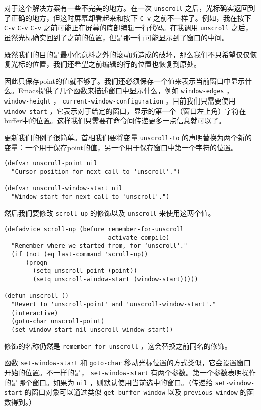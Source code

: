 对于这个解决方案有一些不完美的地方。在一次 \texttt{unscroll} 之后，光标确实返回到了正确的地方，但这时屏幕却看起来和按下 \verb|C-v| 之前不一样了。例如，我在按下 \verb|C-v| \verb|C-v| \verb|C-v| 之前可能正在屏幕的底部编辑一行代码。在我调用 \texttt{unscroll} 之后，虽然光标确实回到了之前的位置，但是那一行可能显示到了窗口的中间。

既然我们的目的是最小化意料之外的滚动所造成的破坏，那么我们不只希望仅仅恢复光标的位置，我们还希望之前编辑的行的位置也恢复到原处。

因此只保存point的值就不够了。我们还必须保存一个值来表示当前窗口中显示什么。Emacs提供了几个函数来描述窗口中显示什么，例如 \texttt{window-edges} ， \texttt{window-height} ， \texttt{current-window-configuration} 。目前我们只需要使用 \texttt{window-start} ，它表示对于给定的窗口，显示的第一个（窗口左上角）字符在buffer中的位置。这样我们只需要在命令间传递更多一点信息就可以了。

更新我们的例子很简单。首相我们要将变量 \texttt{unscroll-to} 的声明替换为两个新的变量：一个用于保存point的值，另一个用于保存窗口中第一个字符的位置。

\begin{verbatim}
(defvar unscroll-point nil
  "Cursor position for next call to 'unscroll'.")
  
(defvar unscroll-window-start nil
  "Window start for next call to 'unscroll'.")
\end{verbatim}

然后我们要修改 \texttt{scroll-up} 的修饰以及 \texttt{unscroll} 来使用这两个值。

\begin{verbatim}
(defadvice scroll-up (before remember-for-unscroll
                             activate compile)
  "Remember where we started from, for ‘unscroll'."
  (if (not (eq last-command 'scroll-up))
      (progn
        (setq unscroll-point (point))
        (setq unscroll-window-start (window-start)))))

(defun unscroll ()
  "Revert to 'unscroll-point' and 'unscroll-window-start'."
  (interactive)
  (goto-char unscroll-point)
  (set-window-start nil unscroll-window-start))
\end{verbatim}

修饰的名称仍然是 \texttt{remember-for-unscroll} ，这会替换之前同名的修饰。

函数 \texttt{set-window-start} 和 \texttt{goto-char} 移动光标位置的方式类似，它会设置窗口开始的位置。不一样的是， \texttt{set-window-start} 有两个参数。第一个参数表明操作的是哪个窗口。如果为 \texttt{nil} ，则默认使用当前选中的窗口。（传递给 \texttt{set-window-start} 的窗口对象可以通过类似 \texttt{get-buffer-window} 以及 \texttt{previous-window} 的函数得到。）


